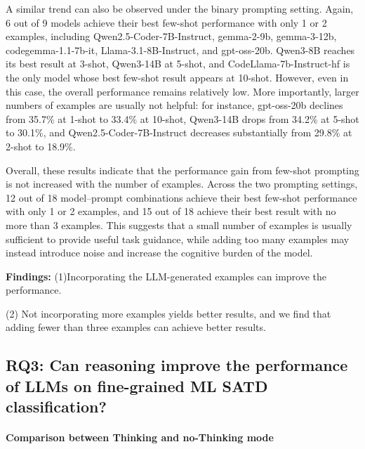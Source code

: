 \documentclass[acmsmall,screen,review,anonymous]{acmart}
\begin{document}
A similar trend can also be observed under the binary prompting setting. Again, 6 out of 9 models achieve their best few-shot performance with only 1 or 2 examples, including Qwen2.5-Coder-7B-Instruct, gemma-2-9b, gemma-3-12b, codegemma-1.1-7b-it, Llama-3.1-8B-Instruct, and gpt-oss-20b. Qwen3-8B reaches its best result at 3-shot, Qwen3-14B at 5-shot, and CodeLlama-7b-Instruct-hf is the only model whose best few-shot result appears at 10-shot. However, even in this case, the overall performance remains relatively low. More importantly, larger numbers of examples are usually not helpful: for instance, gpt-oss-20b declines from 35.7\% at 1-shot to 33.4\% at 10-shot, Qwen3-14B drops from 34.2\% at 5-shot to 30.1\%, and Qwen2.5-Coder-7B-Instruct decreases substantially from 29.8\% at 2-shot to 18.9\%.

Overall, these results indicate that the performance gain from few-shot prompting is not increased with the number of examples. Across the two prompting settings, 12 out of 18 model--prompt combinations achieve their best few-shot performance with only 1 or 2 examples, and 15 out of 18 achieve their best result with no more than 3 examples. This suggests that a small number of examples is usually sufficient to provide useful task guidance, while adding too many examples may instead introduce noise and increase the cognitive burden of the model.


\begin{boxB}
\textbf{Findings:} (1)Incorporating the LLM-generated examples can improve the performance.

(2) Not incorporating more examples yields better results, and we find that adding fewer than three examples can achieve better results.


\end{boxB}


\subsection{RQ3: Can reasoning improve the performance of LLMs on fine-grained ML SATD classification?}


\paragraph{Comparison between Thinking and no-Thinking mode}
\end{document}
